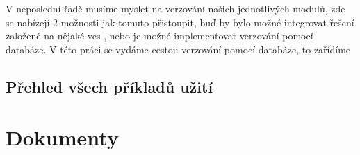 V neposlední řadě musíme myslet na verzování našich jednotlivých modulů, zde se nabízejí 2 možnosti jak tomuto přistoupit, buď by bylo možné integrovat
řešení založené na nějaké vcs , nebo je možné implementovat verzování pomocí databáze. V této práci se vydáme cestou
verzování pomocí databáze, to zařídíme

\subsection{Přehled všech příkladů užití}

\section{Dokumenty}


